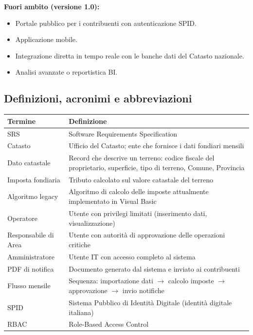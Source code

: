 \documentclass[12pt, a4paper]{article}
\begin{document}
\medskip\noindent\textbf{Fuori ambito (versione 1.0):}
\begin{itemize}
  \item Portale pubblico per i contribuenti con autenticazione SPID.
  \item Applicazione mobile.
  \item Integrazione diretta in tempo reale con le banche dati del Catasto nazionale.
  \item Analisi avanzate o reportistica BI.
\end{itemize}

\subsection{Definizioni, acronimi e abbreviazioni}

\begin{longtable}{lp{10cm}}
  \toprule
  \textbf{Termine} & \textbf{Definizione} \\
  \midrule
  \endhead
  SRS       & Software Requirements Specification \\
  Catasto   & Ufficio del Catasto; ente che fornisce i dati fondiari mensili \\
  Dato catastale & Record che descrive un terreno: codice fiscale del proprietario, superficie, tipo di terreno, Comune, Provincia \\
  Imposta fondiaria & Tributo calcolato sul valore catastale del terreno \\
  Algoritmo legacy & Algoritmo di calcolo delle imposte attualmente implementato in Visual Basic \\
  Operatore & Utente con privilegi limitati (inserimento dati, visualizzazione) \\
  Responsabile di Area & Utente con autorità di approvazione delle operazioni critiche \\
  Amministratore & Utente IT con accesso completo al sistema \\
  PDF di notifica & Documento generato dal sistema e inviato ai contribuenti \\
  Flusso mensile & Sequenza: importazione dati $\to$ calcolo imposte $\to$ approvazione $\to$ invio notifiche \\
  SPID      & Sistema Pubblico di Identità Digitale (identità digitale italiana) \\
  RBAC      & Role-Based Access Control \\
  \bottomrule
\end{longtable}
\end{document}
